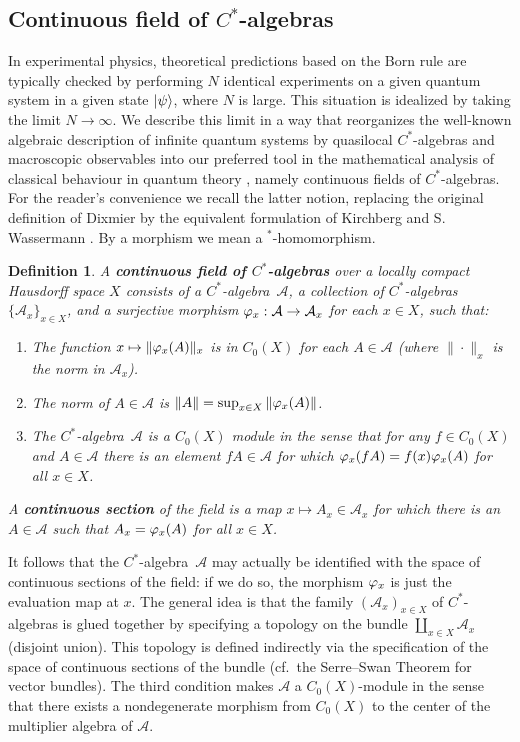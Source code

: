 \documentclass[12pt]{article}
\newcommand{\ca}{$C^*$-algebra} \newcommand{\jba}{JB-algebra}
\newcommand{\raw}{\rightarrow} \newcommand{\rat}{\mapsto}
\newcommand{\CA}{{\mathcal A}} \newcommand{\CB}{{\mathcal B}}
\newtheorem{Definition}{Definition}
\begin{document}
\subsection{Continuous field of \ca s}
In experimental physics, theoretical predictions based on the Born rule are typically checked by performing $N$ identical experiments on a given quantum system in a given state $|\psi\rangle$, where $N$ is large. This situation is idealized by taking the limit $N\raw\infty$. We describe this limit in a way that reorganizes the well-known algebraic description of infinite quantum systems  
by quasilocal \ca s  \cite{T4,BR2,Haag} and macroscopic observables \cite{Hepp,MS,RW,DW,Sewell}
into our preferred tool in the mathematical analysis of classical behaviour in quantum theory
\cite{book,handbook}, namely continuous fields of \ca s. For the reader's convenience we recall  the latter notion, replacing the original definition of Dixmier  \cite{Dix} by the equivalent formulation of Kirchberg and S. Wassermann \cite{KW}. By a morphism we mean a $\mbox{}^*$-homomorphism.
\begin{Definition}\label{defcfca}
  A \textbf{continuous field of $C^*$-algebras} over a
locally compact Hausdorff space $X$   consists of a
 \ca\ $\CA$, a collection of \ca s $\{\CA_{x}\}_{{x}\in X}$, and a surjective morphism $\phv_{x}:\CA\raw\CA_{x}$ for each $x\in X$, such that:
\begin{enumerate}
\item
The function ${x}\mapsto  \|\varphi_{x}(A)\|_{x}$ is in $C_0(X)$ for each $A\in\CA$ (where $\|\cdot\|_{x}$ is the norm in $\CA_{x}$).
\item
The norm of $A\in\CA$ is $\| A\|=\sup_{{x}\in X}\|\varphi_{x}(A)\|$.
\item The \ca\
$\CA$ is a $C_0(X)$ module in the sense that
for any $f\in C_0(X)$ and $A\in\CA$ there is an element $fA\in\CA$ for
which $\varphi_{x}(fA)=f({x})\varphi_{x}(A)$ for all ${x}\in X$.
\end{enumerate}
A \textbf{continuous section}
of the field is a map $x\mapsto A_x \in \CA_{x}$
 for which there is an $A\in \CA$ such that $A_{x}=\varphi_{x}(A)$ for all ${x}\in X$.
 \end{Definition}
 It follows that
the \ca\ $\CA$ may actually be identified with the space of continuous sections of the field: if we do so, the morphism $\varphi_{x}$ is just the evaluation map at $x$. The general idea is that  the  family $(\CA_x)_{x\in X}$ of \ca s is glued together by specifying a topology on the bundle 
$\coprod_{x\in X}\CA_x$ (disjoint union). This topology is defined indirectly via the specification of the space of continuous sections of the bundle (cf.\ the Serre--Swan Theorem for vector bundles). The third condition makes $\CA$ a $C_0(X)$-module in the sense that there exists 
a nondegenerate morphism from $C_0(X)$ to the center of the multiplier algebra of $\CA$. 
\end{document}

